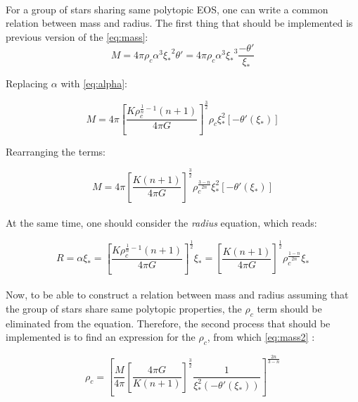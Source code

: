 \documentclass[letterpaper,12pt]{article}
\begin{document}
\paragraph{} For a group of stars sharing same polytopic EOS, one can write a common relation between mass and radius. The first thing that should be implemented is previous version of the \eqref{eq:mass}:
\begin{equation*}
    M = 4 \pi \rho_c \alpha^3 {\xi_*}^2 \theta' = 4 \pi \rho_c \alpha^3 {\xi_*}^3 \frac{-\theta'}{{\xi_*}}
\end{equation*}

Replacing $\alpha$ with \eqref{eq:alpha}:

\begin{equation*}
    M = 4 \pi \left[\frac{K \rho_c^{\frac{1}{n}-1}\left(n+1\right)}{4 \pi G}\right]^{\frac{3}{2}} \rho_c \xi_*^2 \left[-\theta'(\xi_*)\right]
\end{equation*}

Rearranging the terms:

\begin{equation}
    \label{eq:mass2}
    M = 4 \pi \left[\frac{K\left(n+1\right)}{4 \pi G}\right]^{\frac{3}{2}} \rho_c^{\frac{3-n}{2n}} \xi_*^2 \left[-\theta'(\xi_*)\right]
\end{equation}

\paragraph{} At the same time, one should consider the \textit{radius} equation, which reads:

\begin{equation}
    \label{eq:radius}
    R = \alpha \xi_* = \left[\frac{K \rho_c^{\frac{1}{n}-1}\left(n+1\right)}{4 \pi G}\right]^{\frac{1}{2}}\xi_* = \left[\frac{K \left(n+1\right)}{4 \pi G}\right]^{\frac{1}{2}} \rho_c^{\frac{1-n}{2n}} \xi_*
\end{equation}

\paragraph{} Now, to be able to construct a relation between mass and radius assuming that the group of stars share same polytopic properties, the $\rho_c$ term should be eliminated from the equation. Therefore, the second process that should be implemented is to find an expression for the $\rho_c$, from which \eqref{eq:mass2} :

\begin{equation}
    \label{eq:rho_c}
    \rho_c = \left[\frac{M}{4 \pi} \left[\frac{4 \pi G}{K \left(n+1\right)}\right]^{\frac{3}{2}}  \frac{1}{\xi_*^2\left(-\theta'(\xi_*)\right)}\right]^{\frac{2n}{3-n}}
\end{equation}
\end{document}
